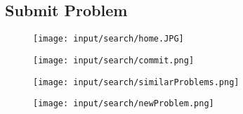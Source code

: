 \subsection{Submit Problem}

\begin{frame}
\begin{figure}[htbp]
\begin{center}
\texttt{[image: input/search/home.JPG]}
\end{center}
\end{figure}

\end{frame}

\begin{frame}

\begin{figure}[htbp]
\begin{center}
\texttt{[image: input/search/commit.png]}
\end{center}
\end{figure}

\end{frame}

\begin{frame}

\begin{figure}[htbp]
\begin{center}
\texttt{[image: input/search/similarProblems.png]}
\end{center}
\end{figure}

\end{frame}

\begin{frame}

\begin{figure}[htbp]
\begin{center}
\texttt{[image: input/search/newProblem.png]}
\end{center}
\end{figure}

\end{frame}



